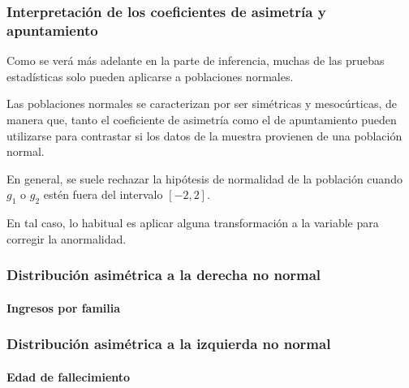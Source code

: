 \begin{frame}
\frametitle{Interpretación de los coeficientes de asimetría y apuntamiento}
Como se verá más adelante en la parte de inferencia, muchas de las pruebas estadísticas solo pueden aplicarse a poblaciones normales.

Las poblaciones normales se caracterizan por ser simétricas y mesocúrticas, de manera que, tanto el coeficiente de asimetría como el de apuntamiento pueden utilizarse para contrastar si los datos de la muestra provienen de una población normal.

En general, se suele rechazar la hipótesis de normalidad de la población cuando $g_1$ o $g_2$ estén fuera del intervalo $[-2,2]$.

En tal caso, lo habitual es aplicar alguna transformación a la variable para corregir la anormalidad.

\end{frame}

\begin{frame}
\frametitle{Distribución asimétrica a la derecha no normal}
\framesubtitle{Ingresos por familia}
\begin{center}
\scalebox{0.6}{}
\end{center} 
\end{frame}


\begin{frame}
\frametitle{Distribución asimétrica a la izquierda no normal}
\framesubtitle{Edad de fallecimiento}
\begin{center}
\scalebox{0.6}{}
\end{center}
\end{frame}


